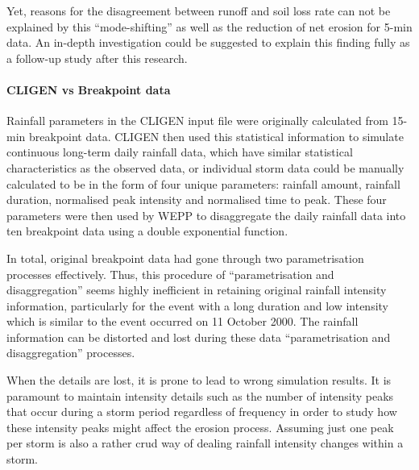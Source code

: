 Yet, reasons for the disagreement between runoff and soil loss rate can
not be explained by this ``mode-shifting'' as well as the reduction of net
erosion for 5-min data. An in-depth investigation could be suggested to explain
this finding fully as a follow-up study after this research.

\paragraph{CLIGEN vs Breakpoint data} Rainfall parameters in the CLIGEN
input file were originally calculated from 15-min breakpoint data. CLIGEN then
used this statistical information to simulate continuous long-term daily
rainfall data, which have similar statistical characteristics as the observed
data, or individual storm data could be manually calculated to be in the form of
four unique parameters: rainfall amount, rainfall duration, normalised peak
intensity and normalised time to peak. These four parameters were then used by
WEPP to disaggregate the daily rainfall data into ten breakpoint data using a
double exponential function.

In total, original breakpoint data had gone through two parametrisation
processes effectively. Thus, this procedure of ``parametrisation and
disaggregation'' seems highly inefficient in retaining original rainfall
intensity information, particularly for the event with a long duration and low
intensity which is similar to the event occurred on 11 October 2000. The
rainfall information can be distorted and lost during these data
``parametrisation and disaggregation'' processes.

When the details are lost, it is prone to lead to wrong simulation results. It
is paramount to maintain intensity details such as the number of intensity peaks
that occur during a storm period regardless of frequency in order to study how
these intensity peaks might affect the erosion process. Assuming just one peak
per storm is also a rather crud way of dealing rainfall intensity changes within
a storm.

